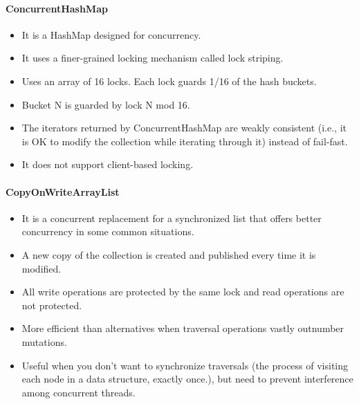 \documentclass[a4paper]{article}
\begin{document}
\paragraph{ConcurrentHashMap}
\begin{itemize}
	\item It is a HashMap designed for concurrency.
	\item It uses a finer-grained locking mechanism called lock striping.
	\item Uses an array of 16 locks. Each lock guards 1/16 of the hash buckets.
	\item Bucket N is guarded by lock N mod 16.
	\item The iterators returned by ConcurrentHashMap are weakly consistent (i.e., it is OK to modify the collection while iterating through it) instead of fail-fast.
	\item It does not support client-based locking.
\end{itemize}
\paragraph{CopyOnWriteArrayList}
\begin{itemize}
	\item It is a concurrent replacement for a synchronized list that offers better concurrency in some common situations.
	\item A new copy of the collection is created and published every time it is modified.
	\item All write operations are protected by the same lock and read operations are not protected. 
	\item More efficient than alternatives when traversal operations vastly outnumber mutations.
	\item Useful when you don’t want to synchronize traversals (the process of visiting each node in a data structure, exactly once.), but need to prevent interference among concurrent threads.
\end{itemize}
\end{document}
